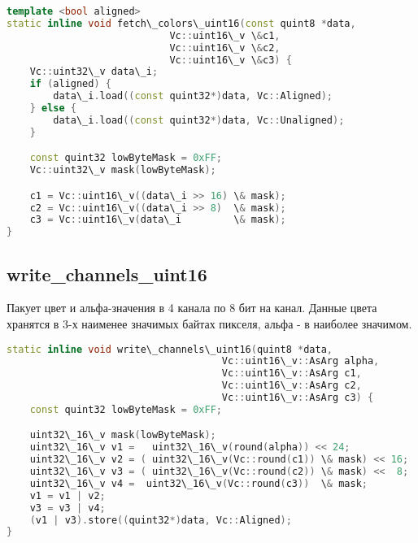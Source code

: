 \begin{lstlisting}[language=c++]
template <bool aligned>
static inline void fetch\_colors\_uint16(const quint8 *data,
                            Vc::uint16\_v \&c1,
                            Vc::uint16\_v \&c2,
                            Vc::uint16\_v \&c3) {
    Vc::uint32\_v data\_i;
    if (aligned) {
        data\_i.load((const quint32*)data, Vc::Aligned);
    } else {
        data\_i.load((const quint32*)data, Vc::Unaligned);
    }

    const quint32 lowByteMask = 0xFF;
    Vc::uint32\_v mask(lowByteMask);

    c1 = Vc::uint16\_v((data\_i >> 16) \& mask);
    c2 = Vc::uint16\_v((data\_i >> 8)  \& mask);
    c3 = Vc::uint16\_v(data\_i         \& mask);
}
\end{lstlisting}

\subsection{write\_channels\_uint16}
Пакует цвет и альфа-значения в 4 канала по 8 бит на канал. Данные цвета хранятся в 3-х наименее значимых байтах пикселя, альфа - в наиболее значимом.

\begin{lstlisting}[language=c++]
static inline void write\_channels\_uint16(quint8 *data,
                                     Vc::uint16\_v::AsArg alpha,
                                     Vc::uint16\_v::AsArg c1,
                                     Vc::uint16\_v::AsArg c2,
                                     Vc::uint16\_v::AsArg c3) {
    const quint32 lowByteMask = 0xFF;

    uint32\_16\_v mask(lowByteMask);
    uint32\_16\_v v1 =   uint32\_16\_v(round(alpha)) << 24;
    uint32\_16\_v v2 = ( uint32\_16\_v(Vc::round(c1)) \& mask) << 16;
    uint32\_16\_v v3 = ( uint32\_16\_v(Vc::round(c2)) \& mask) <<  8;
    uint32\_16\_v v4 =  uint32\_16\_v(Vc::round(c3))  \& mask;
    v1 = v1 | v2;
    v3 = v3 | v4;
    (v1 | v3).store((quint32*)data, Vc::Aligned);
}
\end{lstlisting}




